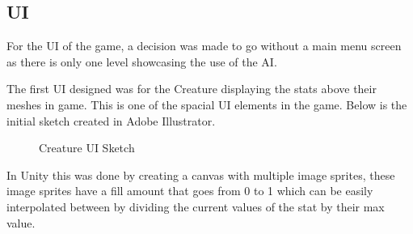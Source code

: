 \documentclass[12pt]{report}
\begin{document}
\subsection{UI}
For the UI of the game, a decision was made to go without a main menu screen as there is only one level showcasing the use of the AI. 

The first UI designed was for the Creature displaying the stats above their meshes in game. This is one of the spacial UI elements in the game. Below is the initial sketch created in Adobe Illustrator.

\begin{figure}[H]
    \centering
    \caption{Creature UI Sketch}
\end{figure}

In Unity this was done by creating a canvas with multiple image sprites, these image sprites have a fill amount that goes from 0 to 1 which can be easily interpolated between by dividing the current values of the stat by their max value.
\end{document}
